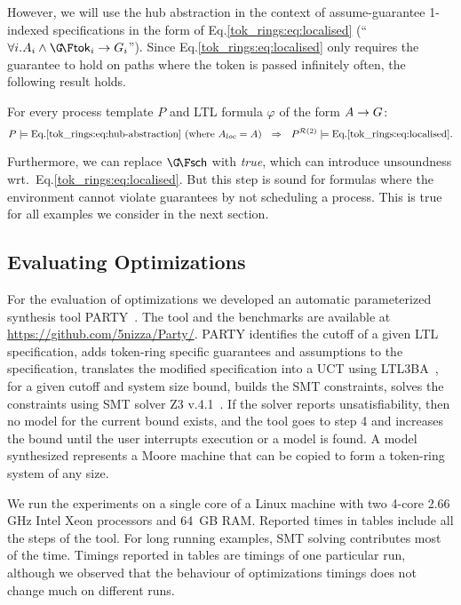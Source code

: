   However, we will use the hub abstraction in the context of assume-guarantee 1-indexed specifications
  in the form of Eq.\ref{tok_rings:eq:localised} (``$\forall i.A_i \land \GF\token_i \impl G_i$'').
  Since Eq.\ref{tok_rings:eq:localised} only requires the guarantee to hold on paths
  where the token is passed infinitely often,
  the following result holds.

  \begin{theorem}
    For every process template $P$
    and LTL formula $\varphi$ of the form $A \rightarrow G$:
    $$
    P \models \text{Eq.\ref{tok_rings:eq:hub-abstraction} (where $A_{loc}=A$)}
    ~~\Rightarrow~~
    P^{\mathcal {R}(2)} \models \text{Eq.\ref{tok_rings:eq:localised}}.
    $$
  \end{theorem}

Furthermore, we can replace $\GF\sch$ with \emph{true}, which can introduce unsoundness wrt.\ Eq.\ref{tok_rings:eq:localised}.
But this step is sound for formulas where the environment cannot
violate guarantees by not scheduling a process.
This is true for all examples we consider in the next section.


\subsection{Evaluating Optimizations}\label{tok_rings:optimisations:experiments}

For the evaluation of optimizations we developed an automatic
parameterized synthesis tool PARTY~\cite{party}.
The tool and the benchmarks are available at {\small\url{https://github.com/5nizza/Party/}}.
PARTY
\li
\-[(1)] identifies the cutoff of a given LTL specification,
\-[(2)] adds token-ring specific guarantees and assumptions to the specification,
\-[(3)] translates the modified specification into a UCT using LTL3BA~\cite{LTL3BA},
\-[(4)] for a given cutoff and system size bound, builds the SMT constraints,
\-[(5)] solves the constraints using SMT solver Z3 v.4.1~\cite{Moura08}.
        If the solver reports unsatisfiability,
        then no model for the current bound exists,
        and the tool goes to step 4 and increases the bound until
        the user interrupts execution or a model is found.
        A model synthesized represents a Moore machine
        that can be copied to form a token-ring system of any size.
\il

We run the experiments on a single core of a Linux machine
with two 4-core 2.66 GHz Intel Xeon processors and 64~GB RAM.
Reported times in tables include all the steps of the tool.
For long running examples, SMT solving contributes most of the time. 
Timings reported in tables are timings of one particular run,
although we observed that the behaviour of optimizations timings does not change much on different runs.

